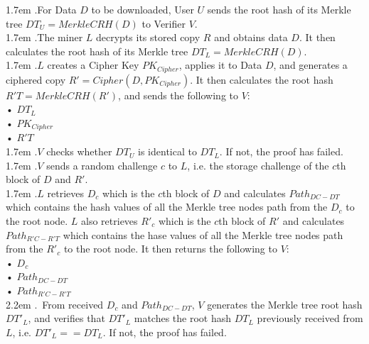 \documentclass[10pt,a4paper]{article}
\begin{document}
\hangindent 1.7em
.\quad For Data $D$ to be downloaded, User $U$ sends the root hash of its Merkle tree $DT_{U}=MerkleCRH(D)$ to Verifier $V$.
\vspace{-0.8em}
\\

\hangindent 1.7em
.\quad The miner $L$ decrypts its stored copy $R$ and obtains data $D$. It then calculates the root hash of its Merkle tree $DT_{L}=MerkleCRH(D)$.
\vspace{-0.8em}
\\

\hangindent 1.7em
.\quad $L$ creates a Cipher Key $PK_{Cipher}$, applies it to Data $D$, and generates a ciphered copy $R'=Cipher(D, PK_{Cipher})$. It then calculates the root hash $R'T=MerkleCRH(R')$, and sends the following to $V$:
\\•  $DT_{L}$ \\ 
   •  $PK_{Cipher}$ \\ 
   •  $R'T$ 
   \vspace{-0.5em}
\\

\hangindent 1.7em
.\quad $V$ checks whether $DT_{U}$ is identical to $DT_{L}$. If not, the proof has failed.
\vspace{-0.8em}
\\

\hangindent 1.7em
.\quad $V$ sends a random challenge $c$ to $L$, i.e. the storage challenge of the $c$th block of $D$ and $R'$.
\vspace{-0.8em}
\\

\hangindent 1.7em
.\quad $L$ retrieves $D_{c}$ which is the $c$th block of $D$ and calculates $Path_{DC-DT}$ which contains the hash values of all the Merkle tree nodes path from the $D_{c}$ to the root node. $L$ also retrieves $R'_{c}$ which is the $c$th block of $R'$ and calculates $Path_{R'C-R'T}$ which contains the hase values of all the Merkle tree nodes path from the $R'_{c}$ to the root node. It then returns the following to $V$:
\\
    •  $D_{c}$\\
   •  $Path_{DC-DT}$\\
   •  $Path_{R'C-R'T}$
   \vspace{-0.5em}
\\

\hangindent 2.2em
.\quad \, From received $D_{c}$ and $Path_{DC-DT}$, $V$ generates the Merkle tree root hash $DT'_{L}$, and verifies that $DT'_{L}$ matches the root hash $DT_{L}$ previously received from $L$, i.e. $DT'_{L} == DT_{L}$. If not, the proof has failed.
\vspace{-0.8em}
\\
\end{document}
